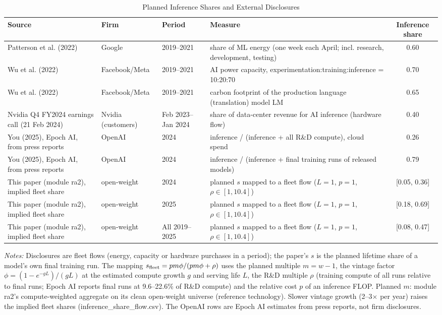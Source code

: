 \begin{table}[htbp]
\centering
\footnotesize
\caption{Planned Inference Shares and External Disclosures}
\label{tab:ra3_disclosures}
\begin{tabular}{p{3.2cm}p{2.0cm}p{1.6cm}p{5.0cm}c}
\toprule
Source & Firm & Period & Measure & Inference share \\
\midrule
Patterson et al. (2022) & Google & 2019--2021 & share of ML energy (one week each April; incl. research, development, testing) & 0.60 \\
Wu et al. (2022) & Facebook/Meta & 2019--2021 & AI power capacity, experimentation:training:inference = 10:20:70 & 0.70 \\
Wu et al. (2022) & Facebook/Meta & 2019--2021 & carbon footprint of the production language (translation) model LM & 0.65 \\
Nvidia Q4 FY2024 earnings call (21 Feb 2024) & Nvidia (customers) & Feb 2023--Jan 2024 & share of data-center revenue for AI inference (hardware flow) & 0.40 \\
You (2025), Epoch AI, from press reports & OpenAI & 2024 & inference / (inference + all R\&D compute), cloud spend & 0.26 \\
You (2025), Epoch AI, from press reports & OpenAI & 2024 & inference / (inference + final training runs of released models) & 0.79 \\
This paper (module ra2), implied fleet share & open-weight & 2024 & planned $s$ mapped to a fleet flow ($L=1$, $p=1$, $\rho\in[1,10.4]$) & [0.05, 0.36] \\
This paper (module ra2), implied fleet share & open-weight & 2025 & planned $s$ mapped to a fleet flow ($L=1$, $p=1$, $\rho\in[1,10.4]$) & [0.18, 0.69] \\
This paper (module ra2), implied fleet share & open-weight & All 2019--2025 & planned $s$ mapped to a fleet flow ($L=1$, $p=1$, $\rho\in[1,10.4]$) & [0.08, 0.47] \\
\bottomrule
\end{tabular}
\begin{tablenotes}\footnotesize
\item \textit{Notes:} Disclosures are fleet flows (energy, capacity or hardware purchases in a period); the paper's $s$ is the planned lifetime share of a model's own final training run. The mapping $s_{\rm fleet}=pm\phi/(pm\phi+\rho)$ uses the planned multiple $m=w-1$, the vintage factor $\phi=(1-e^{-gL})/(gL)$ at the estimated compute growth $g$ and serving life $L$, the R\&D multiple $\rho$ (training compute of all runs relative to final runs; Epoch AI reports final runs at 9.6--22.6\% of R\&D compute) and the relative cost $p$ of an inference FLOP. Planned $m$: module ra2's compute-weighted aggregate on its clean open-weight universe (reference technology). Slower vintage growth (2--3$\times$ per year) raises the implied fleet shares (inference_share_flow.csv). The OpenAI rows are Epoch AI estimates from press reports, not firm disclosures.
\end{tablenotes}
\end{table}
